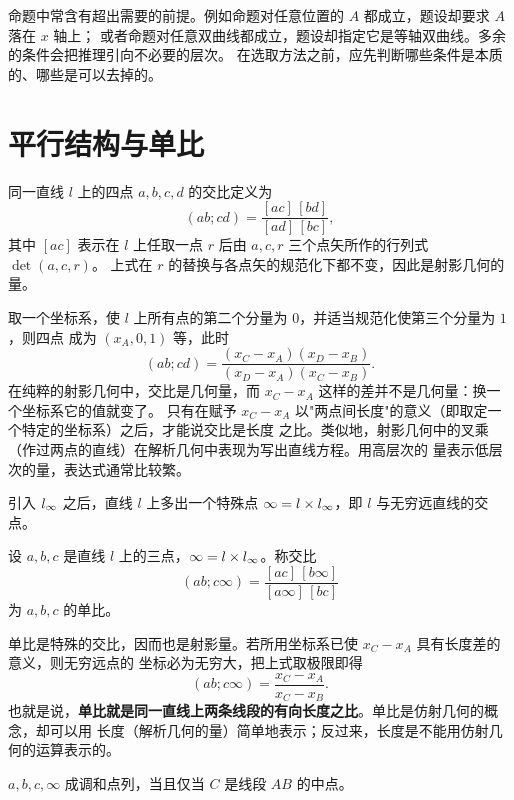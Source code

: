 命题中常含有超出需要的前提。例如命题对任意位置的 $A$ 都成立，题设却要求 $A$ 落在 $x$ 轴上；
或者命题对任意双曲线都成立，题设却指定它是等轴双曲线。多余的条件会把推理引向不必要的层次。
在选取方法之前，应先判断哪些条件是本质的、哪些是可以去掉的。

\section{平行结构与单比}

\begin{definition}[交比]
同一直线 $l$ 上的四点 $a,b,c,d$ 的交比定义为
\[
(ab;cd)=\frac{[ac]\,[bd]}{[ad]\,[bc]},
\]
其中 $[ac]$ 表示在 $l$ 上任取一点 $r$ 后由 $a,c,r$ 三个点矢所作的行列式 $\det(a,c,r)$。
上式在 $r$ 的替换与各点矢的规范化下都不变，因此是射影几何的量。
\end{definition}

取一个坐标系，使 $l$ 上所有点的第二个分量为 $0$，并适当规范化使第三个分量为 $1$，则四点
成为 $(x_A,0,1)$ 等，此时
\[
(ab;cd)=\frac{(x_C-x_A)(x_D-x_B)}{(x_D-x_A)(x_C-x_B)} .
\]
在纯粹的射影几何中，交比是几何量，而 $x_C-x_A$ 这样的差并不是几何量：换一个坐标系它的值就变了。
只有在赋予 $x_C-x_A$ 以"两点间长度"的意义（即取定一个特定的坐标系）之后，才能说交比是长度
之比。类似地，射影几何中的叉乘（作过两点的直线）在解析几何中表现为写出直线方程。用高层次的
量表示低层次的量，表达式通常比较繁。

引入 $l_{\infty}$ 之后，直线 $l$ 上多出一个特殊点 $\infty=l\times l_{\infty}$，即 $l$ 与无穷远直线的交点。

\begin{definition}[单比]
设 $a,b,c$ 是直线 $l$ 上的三点，$\infty=l\times l_{\infty}$。称交比
\[
(ab;c\infty)=\frac{[ac]\,[b\infty]}{[a\infty]\,[bc]}
\]
为 $a,b,c$ 的单比。
\end{definition}

单比是特殊的交比，因而也是射影量。若所用坐标系已使 $x_C-x_A$ 具有长度差的意义，则无穷远点的
坐标必为无穷大，把上式取极限即得
\begin{equation}
(ab;c\infty)=\frac{x_C-x_A}{x_C-x_B}.
\label{eq:simple-ratio}
\end{equation}
也就是说，\textbf{单比就是同一直线上两条线段的有向长度之比}。单比是仿射几何的概念，却可以用
长度（解析几何的量）简单地表示；反过来，长度是不能用仿射几何的运算表示的。

\begin{proposition}[中点]
$a,b,c,\infty$ 成调和点列，当且仅当 $C$ 是线段 $AB$ 的中点。
\end{proposition}

